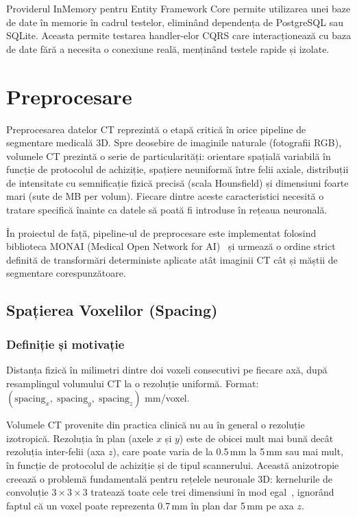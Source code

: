 \documentclass[12pt, a4paper]{report}
\begin{document}
Providerul InMemory pentru Entity Framework Core permite utilizarea unei
baze de date în memorie în cadrul testelor, eliminând dependența de PostgreSQL
sau SQLite. Aceasta permite testarea handler-elor CQRS care interacționează
cu baza de date fără a necesita o conexiune reală, menținând testele rapide
și izolate.



\chapter{Preprocesare}

Preprocesarea datelor CT reprezintă o etapă critică în orice pipeline de segmentare medicală 3D.
Spre deosebire de imaginile naturale (fotografii RGB), volumele CT prezintă o serie de particularități:
orientare spațială variabilă în funcție de protocolul de achiziție, spațiere neuniformă între felii axiale,
distribuții de intensitate cu semnificație fizică precisă (scala Hounsfield) și dimensiuni foarte mari
(sute de MB per volum). Fiecare dintre aceste caracteristici necesită o tratare specifică înainte ca datele
să poată fi introduse în rețeaua neuronală.

În proiectul de față, pipeline-ul de preprocesare este implementat folosind biblioteca MONAI
(Medical Open Network for AI)~\cite{cardoso2022monai} și urmează o ordine strict definită de transformări deterministe
aplicate atât imaginii CT cât și măștii de segmentare corespunzătoare.

\section{Spațierea Voxelilor (Spacing)}
\label{sec:spacing}

\subsection{Definiție și motivație}

\vspace{4pt}
\begin{infobox}
Distanța fizică în milimetri dintre doi voxeli consecutivi pe fiecare axă,
după resamplingul volumului CT la o rezoluție uniformă.
Format: $(\text{spacing}_x,\; \text{spacing}_y,\; \text{spacing}_z)$ mm/voxel.
\end{infobox}

Volumele CT provenite din practica clinică nu au în general o rezoluție izotropică.
Rezoluția în plan (axele $x$ și $y$) este de obicei mult mai bună decât rezoluția inter-felii
(axa $z$), care poate varia de la 0.5\,mm la 5\,mm sau mai mult, în funcție de protocolul de achiziție
și de tipul scannerului. Această anizotropie creează o problemă fundamentală pentru rețelele neuronale 3D:
kernelurile de convoluție $3{\times}3{\times}3$ tratează toate cele trei dimensiuni în mod egal~\cite{cicek2016_3dunet},
ignorând faptul că un voxel poate reprezenta 0.7\,mm în plan dar 5\,mm pe axa $z$.
\end{document}
